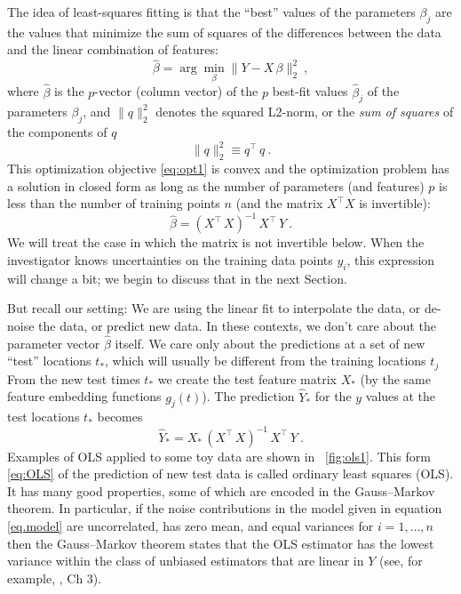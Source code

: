 \documentclass[12pt,letterpaper]{article}
\newcommand{\sectionname}{Section}
\begin{document}
The idea of least-squares fitting is that the ``best'' values of the parameters $\beta_j$ are the values that minimize the sum of squares of the differences between the data and the linear combination of features:
\begin{equation}\label{eq:opt1}
    \hat{\beta} = \arg\min_\beta \|Y - X\,\beta\|_2^2
    ~,
\end{equation}
where $\hat{\beta}$ is the $p$-vector (column vector) of the $p$ best-fit values $\hat{\beta}_j$ of the parameters $\beta_j$, and $\|q\|_2^2$ denotes the squared L2-norm, or the \emph{sum of squares} of the components of $q$
\begin{equation}
    \|q\|_2^2 \equiv q^\top\,q
    ~.
\end{equation}
This optimization objective \eqref{eq:opt1} is convex and the optimization problem has a solution in closed form as long as the number of parameters (and features) $p$ is less than the number of training points $n$ (and the matrix $X^\top X$ is invertible):
\begin{equation}
    \hat{\beta} = (X^\top\,X)^{-1}\,X^\top\,Y
    ~.
    \label{OLS-under}
\end{equation}
We will treat the case in which the matrix is not invertible below.
When the investigator knows uncertainties on the training data points $y_i$, this expression will change a bit; we begin to discuss that in the next \sectionname.

But recall our setting:
We are using the linear fit to interpolate the data, or de-noise the data, or predict new data.
In these contexts, we don't care about the parameter vector $\hat{\beta}$ itself.
We care only about the predictions at a set of new ``test'' locations $t_\ast$, which will usually be different from the training locations $t_j$
From the new test times $t_\ast$ we create the test feature matrix $X_\ast$ (by the same feature embedding functions $g_j(t)$).
The prediction $\hat{Y}_\ast$ for the $y$ values at the test locations $t_\ast$ becomes
\begin{equation}\label{eq:OLS}
    \hat{Y}_\ast = X_\ast\,(X^\top\,X)^{-1}\,X^\top\,Y
    ~.
\end{equation}
Examples of OLS applied to some toy data are shown in \figurename~\ref{fig:ols1}.
This form \eqref{eq:OLS} of the prediction of new test data is called ordinary least squares (OLS). It has many good properties, some of which are encoded in the Gauss--Markov theorem.
In particular, if the noise contributions in the model given in equation \eqref{eq.model} are uncorrelated, has zero mean, and equal variances for $i=1,\ldots, n$ then the Gauss--Markov theorem states that the OLS estimator has the lowest variance within the class of unbiased estimators that are linear in $Y$ (see, for example, \citealt{esl}, Ch 3).
\end{document}
